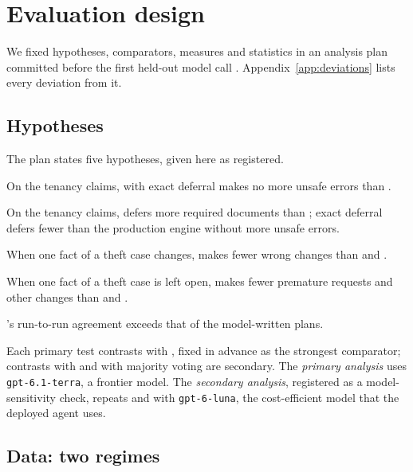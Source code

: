 \section{Evaluation design}
\label{sec:evaluation}

We fixed hypotheses, comparators, measures and statistics in an analysis plan committed before the first held-out model call \cite{casepath2026repo}. Appendix~\ref{app:deviations} lists every deviation from it.

\subsection{Hypotheses}
\label{sec:hypotheses}

The plan states five hypotheses, given here as registered.
\begin{description}[leftmargin=1.2em,labelindent=0pt]
\item[H1 Safety.] On the tenancy claims, \casepath with exact deferral makes no more unsafe errors than .
\item[H2 Deferral.] On the tenancy claims, \casepath defers more required documents than ; exact deferral defers fewer than the production engine without more unsafe errors.
\item[H3 Changed facts.] When one fact of a theft case changes, \casepath makes fewer wrong changes than  and .
\item[H4 Unresolved facts.] When one fact of a theft case is left open, \casepath makes fewer premature requests and other changes than  and .
\item[H5 Stability.] \casepath's run-to-run agreement exceeds that of the model-written plans.
\end{description}
Each primary test contrasts \casepath with , fixed in advance as the strongest comparator; contrasts with  and with majority voting are secondary. The \emph{primary analysis} uses \texttt{gpt-6.1-terra}, a frontier model. The \emph{secondary analysis}, registered as a model-sensitivity check, repeats \casepath and  with \texttt{gpt-6-luna}, the cost-efficient model that the deployed agent uses.

\subsection{Data: two regimes}
\label{sec:data}

